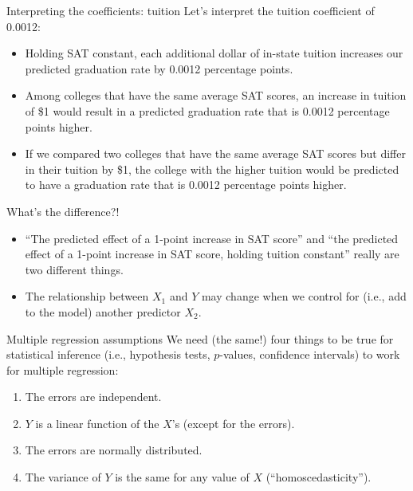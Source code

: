 \documentclass{beamer}\usepackage[]{graphicx}\usepackage[]{color}
\begin{document}
\begin{darkframes}
    \begin{frame}{Interpreting the coefficients: tuition}
      Let's interpret the tuition coefficient of 0.0012:
      \begin{itemize}[<+->]
        \item \alert{Holding SAT constant}, each additional dollar of in-state tuition increases our predicted graduation rate by 0.0012 percentage points.
        \item \alert{Among colleges that have the same average SAT scores}, an increase in tuition of \$1 would result in a predicted graduation rate that is 0.0012 percentage points higher.
        \item \alert{If we compared two colleges that have the same average SAT scores but differ in their tuition by \$1}, the college with the higher tuition would be predicted to have a graduation rate that is 0.0012 percentage points higher.
      \end{itemize}
    \end{frame}

    \begin{frame}{What's the difference?!}
      \begin{itemize}[<+->]
        \item ``The predicted effect of a 1-point increase in SAT score'' and ``the predicted effect of a 1-point increase in SAT score, holding tuition constant'' really are \alert{two different things}.
        \item The relationship between $X_1$ and $Y$ may change when we \alert{control for} (i.e., add to the model) another predictor $X_2$.
      \end{itemize}
    \end{frame}

    \begin{frame}{Multiple regression assumptions}
      We need (the same!) four things to be true for statistical inference (i.e., hypothesis tests, $p$-values, confidence intervals) to work for multiple regression:
      \pause
      \begin{enumerate}
        \item The errors are independent.
        \item $Y$ is a linear function of the $X$'s (except for the errors).
        \item The errors are normally distributed.
        \item The variance of $Y$ is the same for any value of $X$ (``homoscedasticity'').
      \end{enumerate}
    \end{frame}


\end{darkframes}
\end{document}
